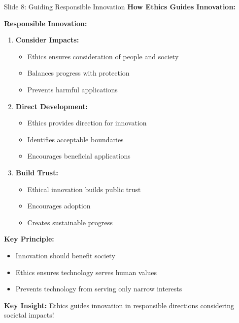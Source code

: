 \documentclass[8pt]{beamer}
\begin{document}
	\begin{frame}{Slide 8: Guiding Responsible Innovation}
		\fontsize{6.5}{7.5}\selectfont
		\textbf{How Ethics Guides Innovation:}
		
		\vspace{0.1cm}
		\textbf{Responsible Innovation:}
		\begin{enumerate}
			\item \textbf{Consider Impacts:}
			\begin{itemize}
				\item Ethics ensures consideration of people and society
				\item Balances progress with protection
				\item Prevents harmful applications
			\end{itemize}
			\item \textbf{Direct Development:}
			\begin{itemize}
				\item Ethics provides direction for innovation
				\item Identifies acceptable boundaries
				\item Encourages beneficial applications
			\end{itemize}
			\item \textbf{Build Trust:}
			\begin{itemize}
				\item Ethical innovation builds public trust
				\item Encourages adoption
				\item Creates sustainable progress
			\end{itemize}
		\end{enumerate}
		
		\vspace{0.1cm}
		\textbf{Key Principle:}
		\begin{itemize}
			\item Innovation should benefit society
			\item Ethics ensures technology serves human values
			\item Prevents technology from serving only narrow interests
		\end{itemize}
		
		\textcolor{myblue}{\textbf{Key Insight:}} Ethics guides innovation in \textcolor{myblue}{responsible directions} considering societal impacts!
	\end{frame}
	
\end{document}
